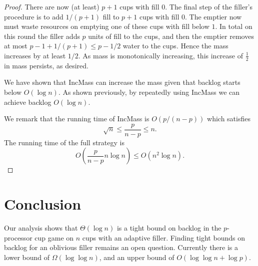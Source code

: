 \documentclass[twocolumn,11pt]{article}
\begin{document}
\begin{proof}
There are now (at least) $p+1$ cups with fill $0$. The final step
of the filler's procedure is to add $1/(p+1)$ fill to $p+1$ cups with
fill $0$. 
The emptier now must waste resources on emptying one of these
cups with fill below $1$. In total on this round the filler adds
$p$ units of fill to the cups, and then the emptier removes at
most $p-1 + 1/(p+1) \le p-1/2$ water to the cups. Hence the mass
increases by at least $1/2$. As mass is monotonically increasing,
this increase of $\frac{1}{2}$ in mass persists, as desired.

We have shown that IncMass can increase the mass given that
backlog starts below $O(\log n)$. As shown previously, by
repeatedly using IncMass we can achieve backlog $O(\log n)$.

We remark that the running time of IncMass is $O(p/(n-p))$ 
which satisfies
$$\sqrt{n} \le \frac{p}{n-p} \le n.$$
The running time of the full strategy is 
$$O\left(\frac{p}{n-p} n\log n\right) \le O(n^2 \log n).$$
\end{proof}

\section{Conclusion}
Our analysis shows that $\Theta(\log n)$ is a tight bound on
backlog in the $p$-processor cup game on $n$ cups with an
adaptive filler. Finding tight bounds on backlog for an oblivious
filler remains an open question. Currently there is a lower bound
of $\Omega(\log \log n)$, and an upper bound of $O(\log \log n +
\log p)$.



\end{document}
